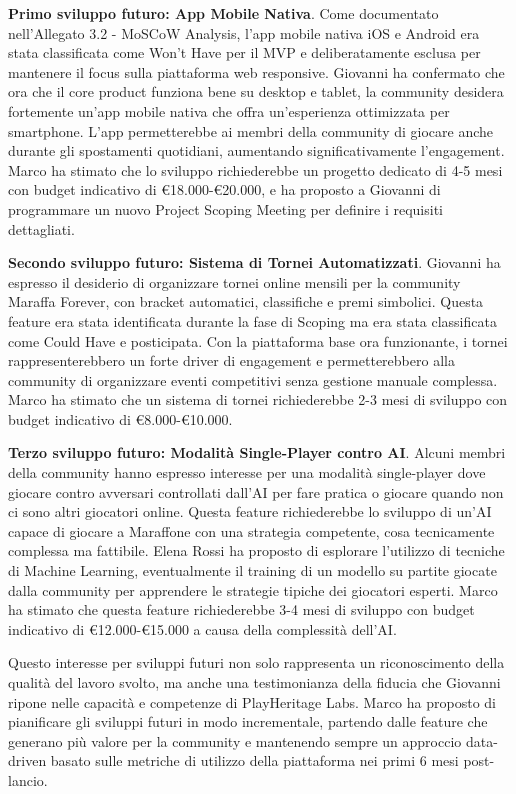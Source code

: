\textbf{Primo sviluppo futuro: App Mobile Nativa}. Come documentato nell'Allegato 3.2 - MoSCoW Analysis, l'app mobile nativa iOS e Android era stata classificata come Won't Have per il MVP e deliberatamente esclusa per mantenere il focus sulla piattaforma web responsive. Giovanni ha confermato che ora che il core product funziona bene su desktop e tablet, la community desidera fortemente un'app mobile nativa che offra un'esperienza ottimizzata per smartphone. L'app permetterebbe ai membri della community di giocare anche durante gli spostamenti quotidiani, aumentando significativamente l'engagement. Marco ha stimato che lo sviluppo richiederebbe un progetto dedicato di 4-5 mesi con budget indicativo di €18.000-€20.000, e ha proposto a Giovanni di programmare un nuovo Project Scoping Meeting per definire i requisiti dettagliati.

\textbf{Secondo sviluppo futuro: Sistema di Tornei Automatizzati}. Giovanni ha espresso il desiderio di organizzare tornei online mensili per la community Maraffa Forever, con bracket automatici, classifiche e premi simbolici. Questa feature era stata identificata durante la fase di Scoping ma era stata classificata come Could Have e posticipata. Con la piattaforma base ora funzionante, i tornei rappresenterebbero un forte driver di engagement e permetterebbero alla community di organizzare eventi competitivi senza gestione manuale complessa. Marco ha stimato che un sistema di tornei richiederebbe 2-3 mesi di sviluppo con budget indicativo di €8.000-€10.000.

\textbf{Terzo sviluppo futuro: Modalità Single-Player contro AI}. Alcuni membri della community hanno espresso interesse per una modalità single-player dove giocare contro avversari controllati dall'AI per fare pratica o giocare quando non ci sono altri giocatori online. Questa feature richiederebbe lo sviluppo di un'AI capace di giocare a Maraffone con una strategia competente, cosa tecnicamente complessa ma fattibile. Elena Rossi ha proposto di esplorare l'utilizzo di tecniche di Machine Learning, eventualmente il training di un modello su partite giocate dalla community per apprendere le strategie tipiche dei giocatori esperti. Marco ha stimato che questa feature richiederebbe 3-4 mesi di sviluppo con budget indicativo di €12.000-€15.000 a causa della complessità dell'AI.

Questo interesse per sviluppi futuri non solo rappresenta un riconoscimento della qualità del lavoro svolto, ma anche una testimonianza della fiducia che Giovanni ripone nelle capacità e competenze di PlayHeritage Labs. Marco ha proposto di pianificare gli sviluppi futuri in modo incrementale, partendo dalle feature che generano più valore per la community e mantenendo sempre un approccio data-driven basato sulle metriche di utilizzo della piattaforma nei primi 6 mesi post-lancio.

